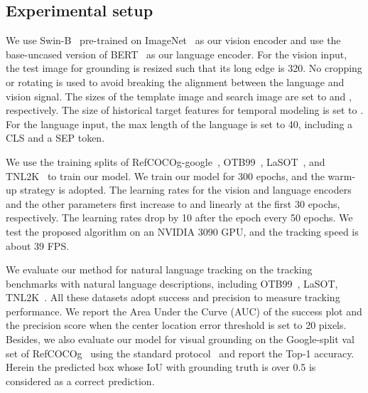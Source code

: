 \newcommand{\tabincell}[2]{\begin{tabular}{@{}#1@{}}#2\end{tabular}}

\subsection{Experimental setup}
We use Swin-B~\cite{SWIN} pre-trained on ImageNet~\cite{imagenet} as our vision encoder and use the base-uncased version of BERT~\cite{devlin2018bert} as our language encoder. 
For the vision input, the test image for grounding is resized such that its long edge is 320. No cropping or rotating is used to avoid breaking the alignment between the language and vision signal. The sizes of the template image and search image are set to  and , respectively. 
The size of historical target features for temporal modeling is set to .
For the language input, the max length of the language is set to 40, including a CLS and a SEP token. 

We use the training splits of RefCOCOg-google~\cite{REFCOCO}, OTB99~\cite{li2017tracking}, LaSOT~\cite{LASOT}, and TNL2K~\cite{TNL2K} to train our model. 
We train our model for 300 epochs, and the warm-up strategy is adopted. 
The learning rates for the vision and language encoders and the other parameters first increase to  and  linearly at the first 30 epochs, respectively. 
The learning rates drop by 10 after the  epoch every 50 epochs. 
We test the proposed algorithm on an NVIDIA 3090 GPU, and the tracking speed is about 39 FPS.

We evaluate our method for natural language tracking on the tracking benchmarks with natural language descriptions, including OTB99~\cite{li2017tracking}, LaSOT\cite{LASOT}, TNL2K~\cite{TNL2K}. 
All these datasets adopt success and precision to measure tracking performance. 
We report the Area Under the Curve (AUC) of the success plot and the precision score when the center location error threshold is set to 20 pixels.
Besides, we also evaluate our model for visual grounding on the Google-split val set of RefCOCOg~\cite{REFCOCO} using the standard protocol~\cite{2019onestagevg, transvg, VLTVG} and report the Top-1 accuracy. Herein the predicted box whose IoU with grounding truth is over 0.5 is considered as a correct prediction.

